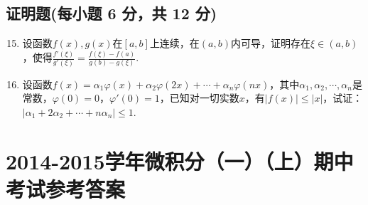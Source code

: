 \documentclass[../main.tex]{subfiles}
\begin{document}
\section{证明题(每小题 6 分，共 12 分)}
\begin{enumerate}
    \setcounter{enumi}{14}
    \item 设函数$f(x),g(x)$在$[a,b]$上连续，在$(a,b)$内可导，证明存在$\xi\in
              (a,b)$，使得$\frac{f'(\xi)}{g'(\xi)}=\frac{f(\xi)-f(a)}{g(b)-g(\xi)}$.
          \vspace{12em}

    \item 设函数$f(x)=\alpha_{1}\varphi(x)+\alpha_{2}\varphi(2x)+\cdots+\alpha
              _{n}\varphi(nx)$，其中$\alpha_{1},\alpha_{2},\cdots,\alpha_{n}$是常数，$\varphi
              (0)=0$，$\varphi'(0)=1$，已知对一切实数$x$，有$|f(x)|\leq |x|$，试证：$|\alpha
              _{1}+2\alpha_{2}+\cdots+n\alpha_{n}|\leq 1$.
          \vspace{12em}
\end{enumerate}

\chapter{2014-2015学年微积分（一）（上）期中考试参考答案}
\end{document}
